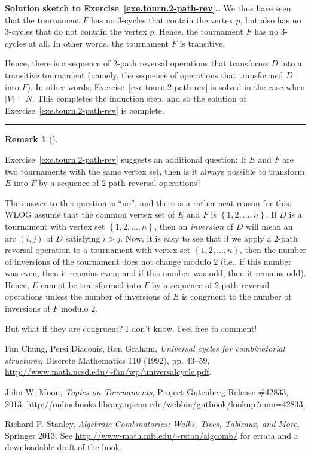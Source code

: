 \documentclass[numbers=enddot,12pt,final,onecolumn,notitlepage]{scrartcl}%
\theoremstyle{definition}
\newtheorem{remk}[theo]{Remark}
\newenvironment{remark}[1][]
{\begin{remk}[#1]\begin{leftbar}}
{\end{leftbar}\end{remk}}
\newenvironment{proof}[1][Proof]{\noindent\textbf{#1.} }{\ \rule{0.5em}{0.5em}}
\newcommand{\set}[1]{\left\{ #1 \right\}}
\newcommand{\abs}[1]{\left| #1 \right|}
\newcommand{\tup}[1]{\left( #1 \right)}
\begin{document}
\begin{proof}[Solution sketch to Exercise~\ref{exe.tourn.2-path-rev}.]
We thus have seen that the tournament $F$ has no $3$-cycles that
contain the vertex $p$, but also has no $3$-cycles that do not contain
the vertex $p$. Hence, the tournament $F$ has no $3$-cycles at all.
In other words, the tournament $F$ is transitive.

Hence, there is a sequence of $2$-path reversal operations that
transforms $D$ into a transitive tournament (namely, the sequence of
operations that transformed $D$ into $F$). In other words,
Exercise~\ref{exe.tourn.2-path-rev} is solved in the case when
$\abs{V} = N$. This completes the induction step, and so the solution
of Exercise~\ref{exe.tourn.2-path-rev} is complete.
\end{proof}

\begin{remark}
Exercise~\ref{exe.tourn.2-path-rev} suggests an additional question:
If $E$ and $F$ are two tournaments with the same vertex set, then is
it always possible to transform $E$ into $F$ by a sequence of
$2$-path reversal operations?

The answer to this question is ``no'', and there is a rather neat
reason for this: WLOG assume that the common vertex set of $E$ and $F$
is $\set{1, 2, \ldots, n}$. If $D$ is a tournament with vertex set
$\set{1, 2, \ldots, n}$, then an \textit{inversion} of $D$ will mean
an arc $\tup{i, j}$ of $D$ satisfying $i > j$. Now, it is easy to see
that if we apply a $2$-path reversal operation to a tournament with
vertex set $\set{1, 2, \ldots, n}$, then the number of inversions of
the tournament does not change modulo $2$ (i.e., if this number was
even, then it remains even; and if this number was odd, then it
remains odd). Hence, $E$ cannot be transformed into $F$ by a sequence
of $2$-path reversal operations unless the number of inversions of $E$
is congruent to the number of inversions of $F$ modulo $2$.

But what if they are congruent? I don't know. Feel free to comment!
\end{remark}

\begin{thebibliography}{9999999999}                                                                                       %

Fan Chung, Persi Diaconis, Ron Graham,
\textit{Universal cycles for combinatorial structures},
Discrete Mathematics 110 (1992), pp. 43--59,
\newline\url{http://www.math.ucsd.edu/~fan/wp/universalcycle.pdf}.

John W. Moon,
\textit{Topics on Tournaments},
Project Gutenberg Release \#42833, 2013,
\newline \url{http://onlinebooks.library.upenn.edu/webbin/gutbook/lookup?num=42833}.

Richard P. Stanley,
\textit{Algebraic Combinatorics:
Walks, Trees, Tableaux, and More},
Springer 2013.
\newline See \url{http://www-math.mit.edu/~rstan/algcomb/} for errata
and a downloadable draft of the book.

\end{thebibliography}
\end{document}
